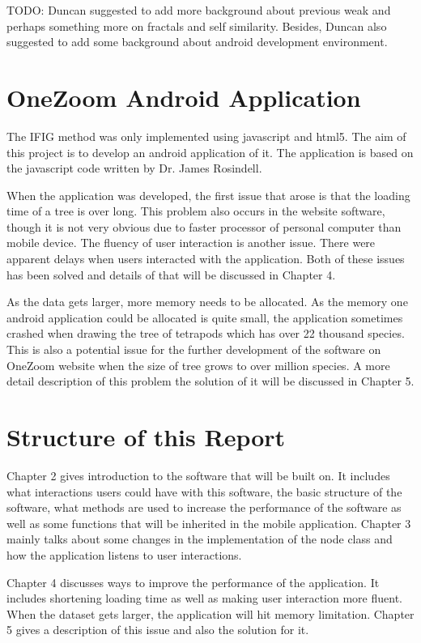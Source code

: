 \documentclass[MSc]{icldt}
\begin{document}
TODO: Duncan suggested to add more background about previous weak and perhaps something more on fractals and self similarity. Besides, Duncan also suggested to add some background about android development environment.



\section{OneZoom Android Application}

The IFIG method was only implemented using javascript and html5. The aim of this project is to develop an android application of it. The application is based on the javascript code written by Dr. James Rosindell. 

When the application was developed, the first issue that arose is that the loading time of a tree is over long. This problem also occurs in the website software, though it is not very obvious due to faster processor of personal computer than mobile device. The fluency of user interaction is another issue. There were apparent delays when users interacted with the application. Both of these issues has been solved and details of that will be discussed in Chapter 4.

As the data gets larger, more memory needs to be allocated. As the memory one android application could be allocated is quite small, the application sometimes crashed when drawing the tree of tetrapods which has over 22 thousand species. This is also a potential issue for the further development of the software on OneZoom website when the size of tree grows to over million species. A more detail description of this problem the solution of it will be discussed in Chapter 5.



\section{Structure of this Report}

Chapter 2 gives introduction to the software that will be built on. It includes what interactions users could have with this software, the basic structure of the software, what methods are used to increase the performance of the software as well as some functions that will be inherited in the mobile application. Chapter 3 mainly talks about some changes in the implementation of the node class and how the application listens to user interactions. 

Chapter 4 discusses ways to improve the performance of the application. It includes shortening loading time as well as making user interaction more fluent. When the dataset gets larger, the application will hit memory limitation. Chapter 5 gives a description of this issue and also the solution for it.
\end{document}
